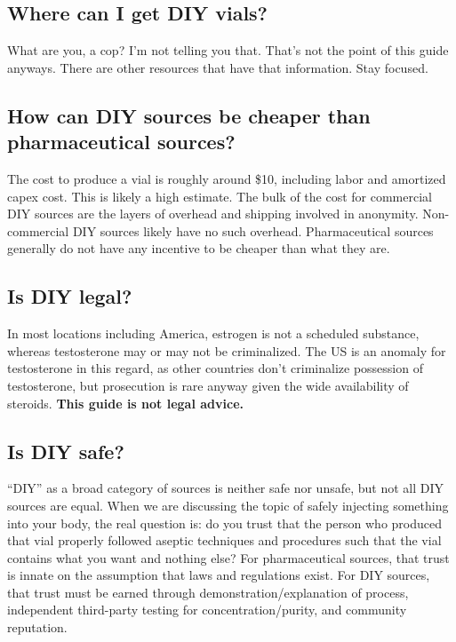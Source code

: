 \documentclass{article}
\begin{document}
\subsection{Where can I get DIY vials?}

What are you, a cop? I’m not telling you that. That’s not the point of this guide anyways. There are other resources that have that information. Stay focused.

\subsection{How can DIY sources be cheaper than pharmaceutical sources?}

The cost to produce a vial is roughly around \$10, including labor and amortized capex cost. This is likely a high estimate. The bulk of the cost for commercial DIY sources are the layers of overhead and shipping involved in anonymity. Non-commercial DIY sources likely have no such overhead. Pharmaceutical sources generally do not have any incentive to be cheaper than what they are. 

\subsection{Is DIY legal?}\label{6-11}

In most locations including America, estrogen is not a scheduled substance, whereas testosterone may or may not be criminalized. The US is an anomaly for testosterone in this regard, as other countries don’t criminalize possession of testosterone, but prosecution is rare anyway given the wide availability of steroids. \textbf{This guide is not legal advice.}

\subsection{Is DIY safe?}

“DIY” as a broad category of sources is neither safe nor unsafe, but not all DIY sources are equal. When we are discussing the topic of safely injecting something into your body, the real question is: do you trust that the person who produced that vial properly followed aseptic techniques and procedures such that the vial contains what you want and nothing else? For pharmaceutical sources, that trust is innate on the assumption that laws and regulations exist. For DIY sources, that trust must be earned through demonstration/explanation of process, independent third-party testing for concentration/purity, and community reputation.
\end{document}
